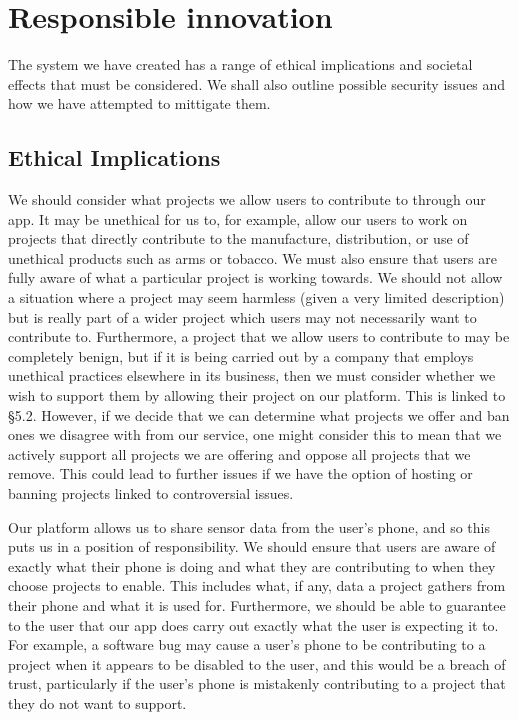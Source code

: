 \documentclass{article}
\begin{document}
\section{Responsible innovation}
The system we have created has a range of ethical implications and societal effects that must be considered. We shall also outline possible
security issues and how we have attempted to mittigate them.
\subsection{Ethical Implications}
We should consider what projects we allow users to contribute to through our app. It may be unethical for us to, for example, allow our
users to work on projects that directly contribute to the manufacture, distribution, or use of unethical products such as arms or tobacco.
We must also ensure that users are fully aware of what a particular project is working towards. We should not allow a situation where a project
may seem harmless (given a very limited description) but is really part of a wider project which users may not necessarily want to contribute to.
Furthermore, a project that we allow users to contribute to may be completely benign, but if it is being carried out by a company that employs
unethical practices elsewhere in its business, then we must consider whether we wish to support them by allowing their project on our platform.
This is linked to §5.2.
However, if we decide that we can determine what projects we offer and ban ones we disagree with from our service, one might consider this to mean
that we actively support all projects we are offering and oppose all projects that we remove. This could lead to further issues if we have the
option of hosting or banning projects linked to controversial issues.

Our platform allows us to share sensor data from the user’s phone, and so this puts us in a position of responsibility. We should ensure that
users are aware of exactly what their phone is doing and what they are contributing to when they choose projects to enable. This includes what,
if any, data a project gathers from their phone and what it is used for. Furthermore, we should be able to guarantee to the user that our app
does carry out exactly what the user is expecting it to. For example, a software bug may cause a user’s phone to be contributing to a project
when it appears to be disabled to the user, and this would be a breach of trust, particularly if the user’s phone is mistakenly contributing
to a project that they do not want to support.
\end{document}

